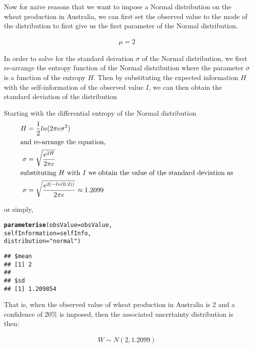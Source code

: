 \documentclass[nojss]{jss}\usepackage[]{graphicx}\usepackage[]{color}
\makeatletter
\newcommand{\hlstr}[1]{\textcolor[rgb]{0.192,0.494,0.8}{#1}}%
\newcommand{\hlstd}[1]{\textcolor[rgb]{0.345,0.345,0.345}{#1}}%
\newcommand{\hlkwc}[1]{\textcolor[rgb]{0.333,0.667,0.333}{#1}}%
\newcommand{\hlkwd}[1]{\textcolor[rgb]{0.737,0.353,0.396}{\textbf{#1}}}%
\newenvironment{kframe}{%
 \def\at@end@of@kframe{}%
 \ifinner\ifhmode%
  \def\at@end@of@kframe{\end{minipage}}%
  \begin{minipage}{\columnwidth}%
 \fi\fi%
 \def\FrameCommand##1{\hskip\@totalleftmargin \hskip-\fboxsep
 \colorbox{shadecolor}{##1}\hskip-\fboxsep
     \hskip-\linewidth \hskip-\@totalleftmargin \hskip\columnwidth}%
 \MakeFramed {\advance\hsize-\width
   \@totalleftmargin\z@ \linewidth\hsize
   \@setminipage}}%
 {\par\unskip\endMakeFramed%
 \at@end@of@kframe}
\newenvironment{knitrout}{}{} %
\makeatother
\begin{document}
Now for naive reasons that we want to impose a Normal distribution on
the wheat production in Australia, we can first set the observed value
to the mode of the distribution to first give us the first parameter
of the Normal distribution.

\begin{align}
  \mu = 2
\end{align}


In order to solve for the standard deivation $\sigma$ of the Normal
distribution, we first re-arrange the entropy function of the Normal
distribution where the parameter $\sigma$ is a function of the entropy
$H$. Then by substituting the expected information $H$ with the
self-information of the observed value $I$, we can then obtain the
standard deviation of the distribution

Starting with the differential entropy of the Normal distribution
\begin{align}
  H &= \frac{1}{2}ln(2\pi e\sigma^2) \nonumber\\
  \intertext{and re-arrange the equation,}
  \sigma &= \sqrt{\frac{e^{2H}}{2\pi e}} \nonumber\\
  \intertext{substituting $H$ with $I$ we obtain the value of the standard deviation as}
  \sigma &= \sqrt{\frac{e^{2(-ln(0.2))}}{2\pi e}} \approx 1.2099 \nonumber
\end{align}

or simply,

\begin{knitrout}
\color{fgcolor}\begin{kframe}
\begin{alltt}
\hlkwd{parameterise}\hlstd{(}\hlkwc{obsValue} \hlstd{= obsValue,}
             \hlkwc{selfInformation} \hlstd{= selfInfo,}
             \hlkwc{distribution} \hlstd{=} \hlstr{"normal"}\hlstd{)}
\end{alltt}
\begin{verbatim}
## $mean
## [1] 2
## 
## $sd
## [1] 1.209854
\end{verbatim}
\end{kframe}
\end{knitrout}

That is, when the observed value of wheat production in Australia is
2 and a confidence of 20\% is
imposed, then the associated uncertainty distribution is then:

\begin{align}
  W \sim N(2, 1.2099)\nonumber
\end{align}
\end{document}

